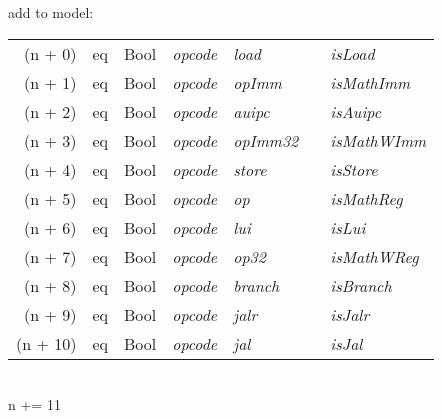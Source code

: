 \begin{algorithm}
    add to model:\\
    \begin{tabular}[h]{>{\ttfamily\color{UniRed}}r >{\ttfamily}l >{\ttfamily\color{UniGrey}}l >{\slshape\color{UniRed}}l >{\slshape\color{UniRed}}l >{\slshape\color{UniRed}}l >{\slshape} l}
        \hline
        \hline
        (n + 0)  & eq & Bool & opcode & load    &  & isLoad     \\
        (n + 1)  & eq & Bool & opcode & opImm   &  & isMathImm  \\
        (n + 2)  & eq & Bool & opcode & auipc   &  & isAuipc    \\
        (n + 3)  & eq & Bool & opcode & opImm32 &  & isMathWImm \\
        (n + 4)  & eq & Bool & opcode & store   &  & isStore    \\
        (n + 5)  & eq & Bool & opcode & op      &  & isMathReg  \\
        (n + 6)  & eq & Bool & opcode & lui     &  & isLui      \\
        (n + 7)  & eq & Bool & opcode & op32    &  & isMathWReg \\
        (n + 8)  & eq & Bool & opcode & branch  &  & isBranch   \\
        (n + 9)  & eq & Bool & opcode & jalr    &  & isJalr     \\
        (n + 10) & eq & Bool & opcode & jal     &  & isJal      \\
        \hline
        \hline
    \end{tabular}\\
    \textcolor{UniRed}{n} += 11\\
\end{algorithm}
